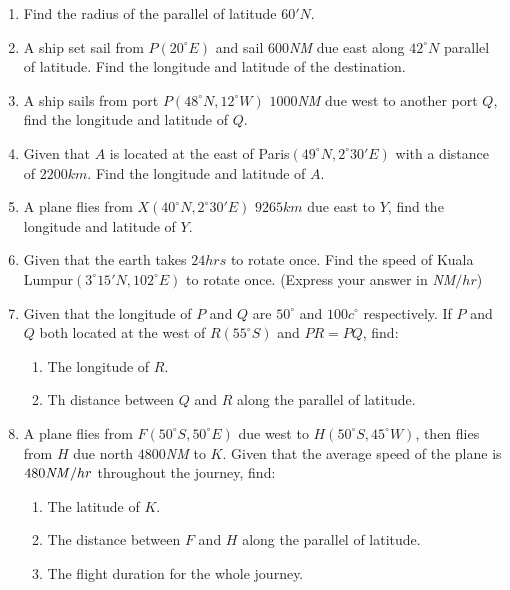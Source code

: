 \documentclass{report}
\begin{document}
\begin{multicols}{2}
\begin{enumerate}
        \item Find the radius of the parallel of latitude $60' N$.
        \item A ship set sail from $P(20^\circ E)$ and sail $600$\emph{NM} due east along
              $42^\circ N$ parallel of latitude. Find the longitude and latitude of the
              destination.
        \item A ship sails from port $P(48^\circ N, 12^\circ W)$ $1000$\emph{NM} due west to
              another port $Q$, find the longitude and latitude of $Q$.
        \item Given that $A$ is located at the east of Paris$(49^\circ N, 2^\circ 30' E)$
              with a distance of $2200km$. Find the longitude and latitude of $A$.
        \item A plane flies from $X(40^\circ N, 2^\circ 30' E)$ $9265km$ due east to $Y$,
              find the longitude and latitude of $Y$.
        \item Given that the earth takes $24hrs$ to rotate once. Find the speed of Kuala
              Lumpur$(3^\circ 15' N, 102^\circ E)$ to rotate once. (Express your answer in
              \emph{NM}$/hr$)
        \item Given that the longitude of $P$ and $Q$ are $50^\circ$ and $100c^\circ$
              respectively. If $P$ and $Q$ both located at the west of $R(55^\circ S)$ and
              $PR = PQ$, find:
              \begin{enumerate}
                  \item The longitude of $R$.
                  \item Th distance between $Q$ and $R$ along the parallel of latitude.
              \end{enumerate}
        \item A plane flies from $F(50^\circ S, 50^\circ E)$ due west to $H(50^\circ S,
                  45^\circ W)$, then flies from $H$ due north $4800$\emph{NM} to $K$. Given that
              the average speed of the plane is $480\text{\emph{NM}}/hr$ throughout the
              journey, find:
              \begin{enumerate}
                  \item The latitude of $K$.
                  \item The distance between $F$ and $H$ along the parallel of latitude.
                  \item The flight duration for the whole journey.
              \end{enumerate}
    \end{enumerate}


\end{multicols}
\end{document}
